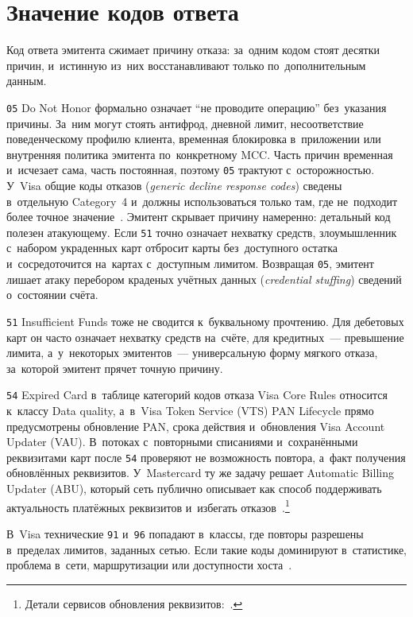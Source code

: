 \section{Значение кодов ответа}\label{sec:decline-response-codes}

Код ответа эмитента сжимает причину отказа: за~одним кодом стоят десятки
причин, и~истинную из~них восстанавливают только по~дополнительным данным.

\texttt{05} Do Not Honor формально означает \enquote{не проводите операцию}
без~указания причины. За~ним могут стоять антифрод, дневной
лимит, несоответствие поведенческому профилю клиента, временная блокировка
в~приложении или внутренняя политика эмитента по~конкретному MCC. Часть причин
временная и~исчезает сама, часть постоянная, поэтому \texttt{05} трактуют
с~осторожностью. У~Visa общие коды отказов (\textit{generic decline response
codes}) сведены в~отдельную Category~4 и~должны использоваться только там, где
не~подходит более точное значение~\cite{visa-core-rules}. Эмитент скрывает
причину намеренно: детальный код полезен атакующему. Если
\texttt{51} точно означает нехватку средств, злоумышленник с~набором
украденных карт отбросит карты без~доступного остатка и~сосредоточится
на~картах с~доступным лимитом. Возвращая \texttt{05}, эмитент лишает атаку
перебором краденых учётных данных (\textit{credential stuffing}) сведений
о~состоянии счёта.

\texttt{51} Insufficient Funds тоже не сводится к~буквальному прочтению. Для
дебетовых карт он часто означает нехватку средств на~счёте, для кредитных~---
превышение лимита, а~у~некоторых эмитентов~--- универсальную форму мягкого
отказа, за~которой эмитент прячет точную причину.

\texttt{54} Expired Card в~таблице категорий кодов отказа Visa Core Rules
относится к~классу Data quality, а~в~Visa Token Service (VTS) PAN Lifecycle
прямо предусмотрены обновление PAN, срока действия и~обновления Visa Account
Updater (VAU). В~потоках с~повторными списаниями и~сохранёнными реквизитами
карт после \texttt{54} проверяют не возможность повтора, а~факт получения
обновлённых реквизитов. У~Mastercard ту же задачу решает Automatic Billing
Updater (ABU), который сеть публично описывает как способ поддерживать
актуальность платёжных реквизитов и~избегать
отказов~\cite{visa-core-rules,mc-abu}.\footnote{Детали сервисов обновления реквизитов:~\cite{visa-vts,visa-vau,mc-bill-pay-solutions}.}

В~Visa технические \texttt{91} и~\texttt{96} попадают в~классы, где повторы
разрешены в~пределах лимитов, заданных сетью. Если такие коды
доминируют в~статистике, проблема в~сети, маршрутизации или доступности
хоста~\cite{visa-core-rules}.

